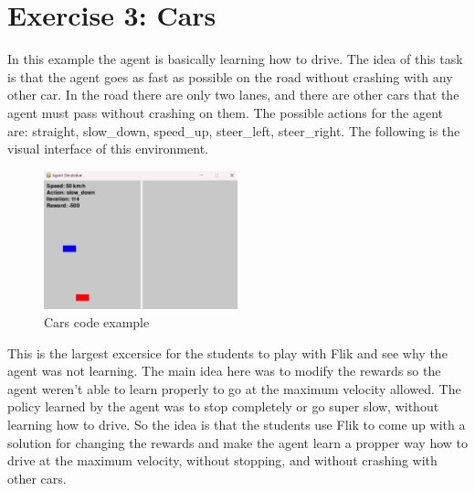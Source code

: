 \section{Exercise 3: Cars}
In this example the agent is basically learning how to drive. The idea of this task is that the agent goes as 
fast as possible on the road without crashing with any other car. In the road there are only two lanes, and there 
are other cars that the agent must pass without crashing on them. The possible actions for the agent are: 
straight, slow\_down, speed\_up, steer\_left, steer\_right. The following is the visual interface of this environment.

\begin{figure}[h]
    \centering
    \includegraphics[width=0.5\textwidth]{figures/cars_example.png}
    \caption{Cars code example}
    \label{fig:cars-code-example}
\end{figure}

This is the largest excersice for the students to play with Flik and see why the agent was not learning. The main 
idea here was to modify the rewards so the agent weren't able to learn properly to go at the maximum velocity allowed.
The policy learned by the agent was to stop completely or go super slow, without learning how to drive. So the idea 
is that the students use Flik to come up with a solution for changing the rewards and make the agent learn a propper 
way how to drive at the maximum velocity, without stopping, and without crashing with other cars.

\endinput

